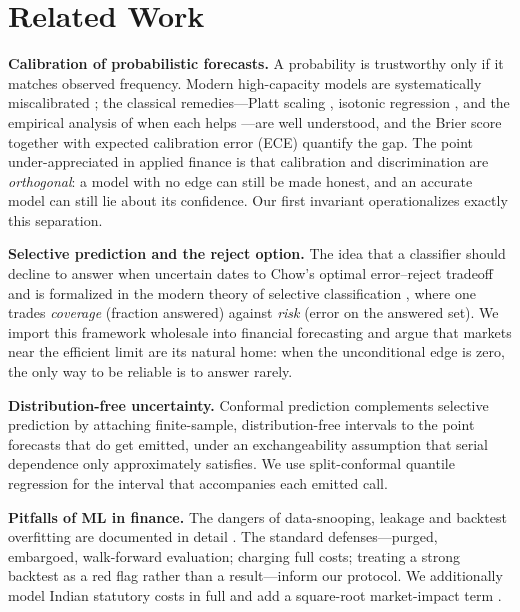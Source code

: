 \documentclass[conference]{IEEEtran}
\begin{document}
\section{Related Work}
\textbf{Calibration of probabilistic forecasts.} A probability is trustworthy only
if it matches observed frequency. Modern high-capacity models are systematically
miscalibrated \cite{guo2017}; the classical remedies---Platt scaling
\cite{platt1999}, isotonic regression \cite{zadrozny2002}, and the empirical
analysis of when each helps \cite{niculescu2005}---are well understood, and the
Brier score \cite{brier1950} together with expected calibration error (ECE)
quantify the gap. The point under-appreciated in applied finance is that
calibration and discrimination are \emph{orthogonal}: a model with no edge can
still be made honest, and an accurate model can still lie about its confidence. Our
first invariant operationalizes exactly this separation.

\textbf{Selective prediction and the reject option.} The idea that a classifier
should decline to answer when uncertain dates to Chow's optimal error--reject
tradeoff \cite{chow1970} and is formalized in the modern theory of selective
classification \cite{elyaniv2010,geifman2017}, where one trades \emph{coverage}
(fraction answered) against \emph{risk} (error on the answered set). We import this
framework wholesale into financial forecasting and argue that markets near the
efficient limit are its natural home: when the unconditional edge is zero, the only
way to be reliable is to answer rarely.

\textbf{Distribution-free uncertainty.} Conformal prediction
\cite{vovk2005,romano2019,angelopoulos2023} complements selective prediction by
attaching finite-sample, distribution-free intervals to the point forecasts that
do get emitted, under an exchangeability assumption that serial dependence only
approximately satisfies. We use split-conformal quantile regression for the
interval that accompanies each emitted call.

\textbf{Pitfalls of ML in finance.} The dangers of data-snooping, leakage and
backtest overfitting are documented in detail
\cite{lopezdeprado2018,bailey2014,arnott2019,harvey2016}. The standard
defenses---purged, embargoed, walk-forward evaluation; charging full costs;
treating a strong backtest as a red flag rather than a result---inform our
protocol. We additionally model Indian statutory costs in full and add a
square-root market-impact term \cite{almgren2001,grinold2000}.
\end{document}
